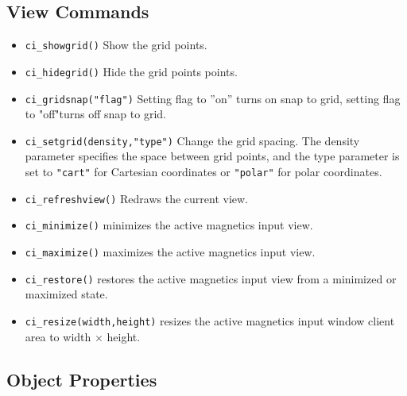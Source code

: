 \subsection{View Commands}
\begin{itemize}
\item \texttt{ci\_showgrid()} Show the grid points.

\item \texttt{ci\_hidegrid()} Hide the grid points points.

\item \texttt{ci\_gridsnap("flag")} Setting flag to ''on'' turns on snap to grid,
setting flag to "off"turns off snap to grid.

\item \texttt{ci\_setgrid(density,"type")} Change the grid spacing. The density
parameter specifies the space between grid points, and the type
parameter is set to \texttt{"cart"} for Cartesian coordinates or
\texttt{"polar"} for polar coordinates.

\item \texttt{ci\_refreshview()} Redraws the current view.

\item{\tt ci\_minimize()} minimizes the active magnetics input view.

\item{\tt ci\_maximize()} maximizes the active magnetics input view.

\item{\tt ci\_restore()} restores the active magnetics input view from a
 minimized or maximized state.

\item{\tt ci\_resize(width,height)} resizes the active magnetics input
 window client area to width $\times$ height.

\end{itemize}




\subsection{Object Properties}

